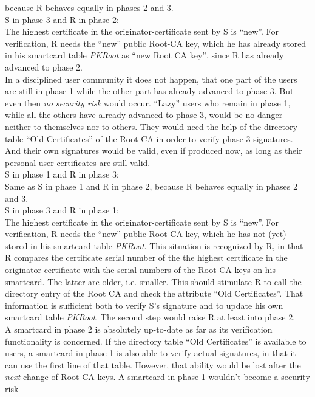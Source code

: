 because R behaves equally in phases 2 and 3.
\\[1ex]
S in phase 3 and R in phase 2:
\\[1ex]
The highest certificate in the originator-certificate sent by S is ``new''.
For verification,
R needs the ``new'' public Root-CA key, which he has already stored
in his smartcard table {\em PKRoot} as ``new Root CA key'',
since R has already advanced to phase 2.
\\[1ex]
In a disciplined user community it does not happen,
that one part of the users are still in phase 1 while the other
part has already advanced to phase 3.
But even then {\em no security risk} would occur.
``Lazy'' users who remain in phase 1, while all the others
have already advanced to phase 3,
would be no danger neither to themselves nor to others.
They would need the help of the directory table ``Old Certificates''
of the Root CA in order to verify phase 3 signatures.
And their own signatures would be valid,
even if produced now, as long as their personal user certificates
are still valid.
\\[1ex]
S in phase 1 and R in phase 3:
\\[1ex]
Same as S in phase 1 and R in phase 2,
because R behaves equally in phases 2 and 3.
\\[1ex]
S in phase 3 and R in phase 1:
\\[1ex]
The highest certificate in the originator-certificate sent by S is ``new''.
For verification,
R needs the ``new'' public Root-CA key, which he has not (yet) stored
in his smartcard table {\em PKRoot}.
This situation is recognized by R,
in that R compares the certificate serial number of the
the highest certificate in the originator-certificate
with the serial numbers of the Root CA keys on his smartcard.
The latter are older, i.e. smaller.
This should stimulate R to call the directory entry of the Root CA
and check the attribute ``Old Certificates''.
That information is sufficient both to verify S's signature
and to update his own smartcard table {\em PKRoot}.
The second step would raise R at least into phase 2.
\\[1ex]
A smartcard in phase 2 is absolutely up-to-date
as far as its verification functionality is concerned.
If the directory table ``Old Certificates'' is available to users,
a smartcard in phase 1 is also able to verify actual signatures,
in that it can use the first line of that table.
However, that ability would be lost after the {\em next}
change of Root CA keys.
A smartcard in phase 1 wouldn't become a security risk
